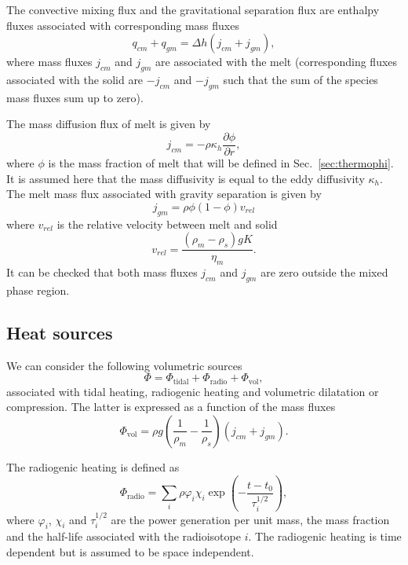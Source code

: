 \documentclass{article}
\begin{document}
The convective mixing flux and the gravitational separation flux are enthalpy fluxes associated with corresponding mass fluxes
\begin{equation}
    q_{cm} + q_{gm} = \Delta h \left( j_{cm} + j_{gm} \right),
\end{equation}
where mass fluxes $j_{cm}$ and $j_{gm}$ are associated with the melt (corresponding fluxes associated with the solid are $-j_{cm}$ and $-j_{gm}$ such that the sum of the species mass fluxes sum up to zero).

The mass diffusion flux of melt is given by
\begin{equation}
    j_{cm} = - \rho \kappa_h \frac{\partial \phi}{\partial r},
    \label{eq.jcm}
\end{equation}
where $\phi$ is the mass fraction of melt that will be defined in Sec.~\ref{sec:thermophi}. It is assumed here that the mass diffusivity is equal to the eddy diffusivity $\kappa_h$. The melt mass flux associated with gravity separation is given by
\begin{equation}
    j_{gm} = \rho \phi (1-\phi) v_{rel}
\end{equation}
where $v_{rel}$ is the relative velocity between melt and solid
\begin{equation}
    v_{rel} = \frac{(\rho_m-\rho_s)g K}{\eta_m}.
    \label{eq.vrel}
\end{equation}
It can be checked that both mass fluxes $j_{cm}$ and $j_{gm}$ are zero outside the mixed phase region.

\subsection{Heat sources}
We can consider the following volumetric sources
\begin{equation}
    \Phi = \Phi_\mathrm{tidal} + \Phi_\mathrm{radio} + \Phi_\mathrm{vol},
\end{equation}
associated with tidal heating, radiogenic heating and volumetric dilatation or compression. The latter is expressed as a function of the mass fluxes
\begin{equation}
    \Phi_\mathrm{vol} = \rho g\left( \frac{1}{\rho_m}- \frac{1}{\rho_s}\right) \left( j_{cm} + j_{gm}\right).
\end{equation}

The radiogenic heating is defined as
\begin{equation}
    \Phi_\mathrm{radio} = \sum_i \rho
    \varphi_i \chi_i \exp\left(-\frac{t-t_0}{\tau^{1/2}_i} \right),
\end{equation}
where $\varphi_i$, $\chi_i$ and $\tau^{1/2}_i$ are the power generation per unit mass, the mass fraction and the half-life associated with the radioisotope $i$. The radiogenic heating is time dependent but is assumed to be space independent.
\end{document}
